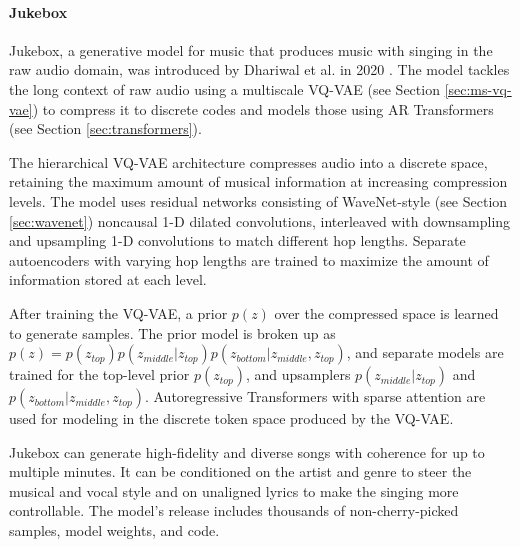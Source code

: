 \paragraph{Jukebox}

Jukebox, a generative model for music that produces music with singing in the raw audio domain, was introduced by Dhariwal et al. in 2020 \cite{dhariwal_jukebox_2020}. The model tackles the long context of raw audio using a multiscale \ac{VQ-VAE} (see Section \ref{sec:ms-vq-vae}) to compress it to discrete codes and models those using \ac{AR} Transformers (see Section \ref{sec:transformers}).

The hierarchical \ac{VQ-VAE} architecture compresses audio into a discrete space, retaining the maximum amount of musical information at increasing compression levels. The model uses residual networks consisting of WaveNet-style (see Section \ref{sec:wavenet}) noncausal 1-D dilated convolutions, interleaved with downsampling and upsampling 1-D convolutions to match different hop lengths. Separate autoencoders with varying hop lengths are trained to maximize the amount of information stored at each level.

After training the \ac{VQ-VAE}, a prior $p(z)$ over the compressed space is learned to generate samples. The prior model is broken up as $p(z) = p(z_{top})p(z_{middle}|z_{top})p(z_{bottom}|z_{middle}, z_{top})$, and separate models are trained for the top-level prior $p(z_{top})$, and upsamplers $p(z_{middle}|z_{top})$ and $p(z_{bottom}|z_{middle}, z_{top})$. Autoregressive Transformers with sparse attention are used for modeling in the discrete token space produced by the \ac{VQ-VAE}.

Jukebox can generate high-fidelity and diverse songs with coherence for up to multiple minutes. It can be conditioned on the artist and genre to steer the musical and vocal style and on unaligned lyrics to make the singing more controllable. The model's release includes thousands of non-cherry-picked samples, model weights, and code.